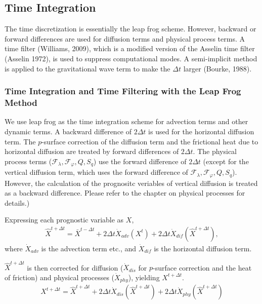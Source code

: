 \hypertarget{time-integration}{%
\subsection{Time Integration}\label{time-integration}}

The time discretization is essentially the leap frog scheme. However, backward or forward differences are used for diffusion terms and physical process terms. A time filter (Williams, 2009), which is
a modified version of the Asselin time filter (Asselin 1972), is used to suppress computational modes. A semi-implicit method is applied to the gravitational wave term to make the \(\Delta t\) larger
(Bourke, 1988).

\hypertarget{time-integration-and-time-filtering-with-leap-frog}{%
\subsubsection{Time Integration and Time Filtering with the Leap Frog Method}\label{time-integration-and-time-filtering-with-leap-frog}}

We use leap frog as the time integration scheme for advection terms and other dynamic terms. A backward difference of \(2 \Delta t\) is used for the horizontal diffusion term. The \(p\)-surface
correction of the diffusion term and the frictional heat due to horizontal diffusion are treated by forward differences of \(2 \Delta t\). The physical process terms
(\({\mathcal F}_\lambda, {\mathcal F}_\varphi, Q, S_q\)) use the forward difference of \(2 \Delta t\) (except for the vertical diffusion term, which uses the forward difference of
\({\mathcal F}_\lambda, {\mathcal F}_\varphi, Q, S_q\)). However, the calculation of the prognositc veriables of vertical diffusion is treated as a backward difference. Please refer to the chapter on
physical processes for details.)

Expressing each prognostic variable as \({X}\), \begin{eqnarray}
  \hat{X}^{t+\Delta t}
    =  \bar{X}^{t-\Delta t}
    + 2 \Delta t
      \dot{X}_{adv}\left( {X}^{t} \right)
    + 2 \Delta t
      \dot{X}_{dif}\left( \hat{X}^{t+\Delta t} \right),   \end{eqnarray} where \(\dot{X}_{adv}\) is the advection term etc., and \(\dot{X}_{dif}\) is the horizontal diffusion term.

\(\hat{X}^{t+\Delta t}\) is then corrected for diffusion (\(\dot{X}_{dis}\) for \(p\)-surface correction and the heat of friction) and physical processes (\(\dot{X}_{phy}\)), yielding
\({X}^{t+\Delta t}\). \begin{eqnarray}
  {X}^{t+\Delta t}
    =  \hat{X}^{t+\Delta t}
    + 2 \Delta t
      \dot{X}_{dis}\left( \hat{X}^{t+\Delta t} \right)
    + 2 \Delta t
      \dot{X}_{phy}\left( \hat{X}^{t+\Delta t} \right)   \end{eqnarray}

